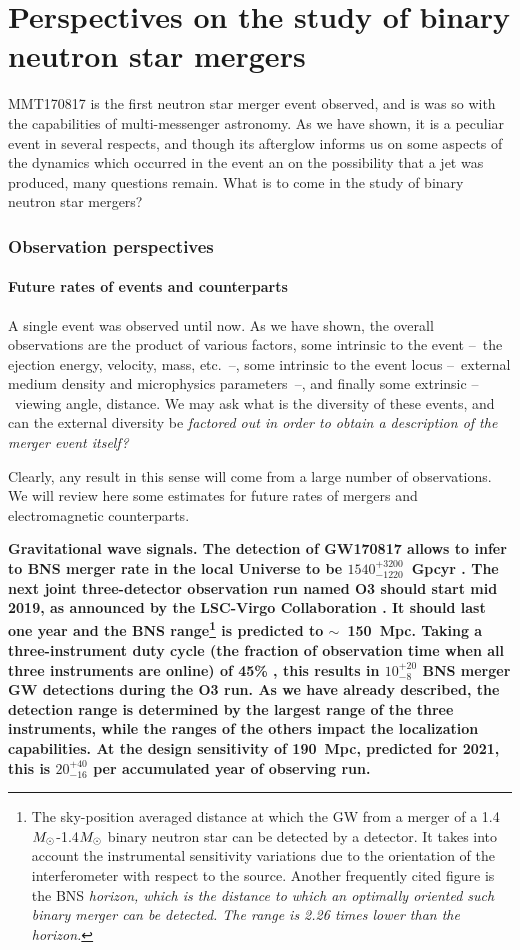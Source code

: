 
\part{Perspectives on the study of binary neutron star mergers}

MMT170817 is the first neutron star merger event observed, and is was so with the capabilities of multi-messenger astronomy. As we have shown, it is a peculiar event in several respects, and though its afterglow informs us on some aspects of the dynamics which occurred in the event an on the possibility that a jet was produced, many questions remain. What is to come in the study of binary neutron star mergers?

\section{Observation perspectives}
\subsection{Future rates of events and counterparts}

A single event was observed until now. As we have shown, the overall observations are the product of various factors, some intrinsic to the event --~the ejection energy, velocity, mass, etc.~--, some intrinsic to the event locus --~external medium density and microphysics parameters~--, and finally some extrinsic --~viewing angle, distance. We may ask what is the diversity of these events, and can the external diversity be \it{factored out} in order to obtain a description of the merger event itself?

Clearly, any result in this sense will come from a large number of observations. We will review here some estimates for future rates of mergers and electromagnetic counterparts.

\bf{Gravitational wave signals.} The detection of GW170817 allows to infer to BNS merger rate in the local Universe to be $1540^{+3200}_{-1220}$~Gpcyr \citep{37}. The next joint three-detector observation run named O3 should start mid 2019, as announced by the LSC-Virgo Collaboration \citep{54}. It should last one year and the BNS range\footnote{The sky-position averaged distance at which the GW from a merger of a 1.4$M_{\odot}$-1.4$M_{\odot}$ binary neutron star can be detected by a detector. It takes into account the instrumental sensitivity variations due to the orientation of the interferometer with respect to the source. Another frequently cited figure is the BNS \it{horizon}, which is the distance to which an  optimally oriented such binary merger can be detected. The range is 2.26 times lower than the horizon.} is predicted to $\sim$~150~Mpc. Taking a three-instrument duty cycle (the fraction of observation time when all three instruments are online) of 45\% \citep{54}, this results in $10^{+20}_{-8}$ BNS merger GW detections during the O3 run. As we have already described, the detection range is determined by the largest range of the three instruments, while the ranges of the others impact the localization capabilities.
At the design sensitivity of 190~Mpc, predicted for 2021, this is $20^{+40}_{-16}$ per accumulated year of observing run.

